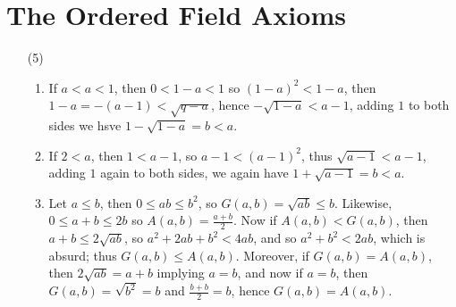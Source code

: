 
\section{The Ordered Field Axioms}

\begin{enumerate}[label=(\arabic*)]
    \begin{enumerate}[label=(\arabic*)]
        \item [(1)]
            \begin{enumerate}
                \item We have  $a^++a^-=\frac{1|a|+a-a}{2}=|a|$ , and  $a^+-a^-= \frac{|a|-|a|+a+a}{2}=a$ .                          
                                                                                                                               
              \item Now Let $a \geq 0$, then  $a^+=\frac{a+a}{2}=a$ and $a^-=\frac{a-a}{2}$, and for $a<0$, then               
                   $a^+=\frac{a-a}{2}=0$  and  $a^-=\frac{-a-a}{2}=-a$ .		
            \end{enumerate}
    \end{enumerate}

    \item [(5)]
        \begin{enumerate}
            \item If $a<a<1$, then  $0<1-a<1$ so  $(1-a)^2<1-a$, then $1-a=-(a-1)<\sqrt{q-a}$, hence  $-\sqrt{1-a}<a-1$, 
                adding  $1$ to both sides we hsve  $1-\sqrt{1-a}=b<a$.

            \item If  $2<a$, then $1<a-1$, so $a-1<(a-1)^2$, thus $\sqrt{a-1}<a-1$, adding $1$ again to both sides, we 
                again have $1+\sqrt{a-1}=b<a$.

            \item Let $a \leq b$, then  $0 \leq ab \leq b^2$, so  $G(a,b)=\sqrt{ab} \leq b$. Likewise,  $0 \leq a+b \leq 2b$ 
                so $A(a,b)=\frac{a+b}{2}$. Now if $A(a,b) < G(a,b)$, then  $a+b \leq 2\sqrt{ab}$, so  $a^2+2ab+b^2 < 4ab$, 
                and so  $a^2+b^2 < 2ab$, which is absurd; thus $G(a,b) \leq A(a,b)$. Moreover, if $G(a,b)=A(a,b)$, then 
                $2\sqrt{ab}=a+b$ implying $a=b$, and now if  $a=b$, then  $G(a,b)=\sqrt{b^2}=b$ and  $\frac{b+b}{2}=b$, hence 
                $G(a,b)=A(a,b)$.
        \end{enumerate}


\end{enumerate}
